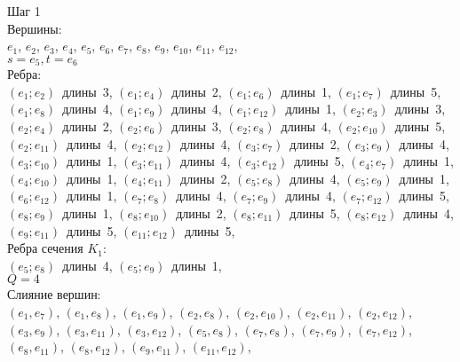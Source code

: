 \bigskip
\noindent
\begin{minipage}{\textwidth}
Шаг 1\\
Вершины:\\
\mbox{$e_{1}$},
\mbox{$e_{2}$},
\mbox{$e_{3}$},
\mbox{$e_{4}$},
\mbox{$e_{5}$},
\mbox{$e_{6}$},
\mbox{$e_{7}$},
\mbox{$e_{8}$},
\mbox{$e_{9}$},
\mbox{$e_{10}$},
\mbox{$e_{11}$},
\mbox{$e_{12}$},
\\
\mbox{$s=e_{5},t=e_{6}$}\\
Ребра:\\
\mbox{$(e_{1};e_{2})$ длины 3},
\mbox{$(e_{1};e_{4})$ длины 2},
\mbox{$(e_{1};e_{6})$ длины 1},
\mbox{$(e_{1};e_{7})$ длины 5},
\mbox{$(e_{1};e_{8})$ длины 4},
\mbox{$(e_{1};e_{9})$ длины 4},
\mbox{$(e_{1};e_{12})$ длины 1},
\mbox{$(e_{2};e_{3})$ длины 3},
\mbox{$(e_{2};e_{4})$ длины 2},
\mbox{$(e_{2};e_{6})$ длины 3},
\mbox{$(e_{2};e_{8})$ длины 4},
\mbox{$(e_{2};e_{10})$ длины 5},
\mbox{$(e_{2};e_{11})$ длины 4},
\mbox{$(e_{2};e_{12})$ длины 4},
\mbox{$(e_{3};e_{7})$ длины 2},
\mbox{$(e_{3};e_{9})$ длины 4},
\mbox{$(e_{3};e_{10})$ длины 1},
\mbox{$(e_{3};e_{11})$ длины 4},
\mbox{$(e_{3};e_{12})$ длины 5},
\mbox{$(e_{4};e_{7})$ длины 1},
\mbox{$(e_{4};e_{10})$ длины 1},
\mbox{$(e_{4};e_{11})$ длины 2},
\mbox{$(e_{5};e_{8})$ длины 4},
\mbox{$(e_{5};e_{9})$ длины 1},
\mbox{$(e_{6};e_{12})$ длины 1},
\mbox{$(e_{7};e_{8})$ длины 4},
\mbox{$(e_{7};e_{9})$ длины 4},
\mbox{$(e_{7};e_{12})$ длины 5},
\mbox{$(e_{8};e_{9})$ длины 1},
\mbox{$(e_{8};e_{10})$ длины 2},
\mbox{$(e_{8};e_{11})$ длины 5},
\mbox{$(e_{8};e_{12})$ длины 4},
\mbox{$(e_{9};e_{11})$ длины 5},
\mbox{$(e_{11};e_{12})$ длины 5},
\\
Ребра сечения $K_{1}$:\\
\mbox{$(e_{5};e_{8})$ длины 4},
\mbox{$(e_{5};e_{9})$ длины 1},
\\
$Q=4$\\
Слияние вершин:\\
\mbox{$(e_{1},e_{7})$},
\mbox{$(e_{1},e_{8})$},
\mbox{$(e_{1},e_{9})$},
\mbox{$(e_{2},e_{8})$},
\mbox{$(e_{2},e_{10})$},
\mbox{$(e_{2},e_{11})$},
\mbox{$(e_{2},e_{12})$},
\mbox{$(e_{3},e_{9})$},
\mbox{$(e_{3},e_{11})$},
\mbox{$(e_{3},e_{12})$},
\mbox{$(e_{5},e_{8})$},
\mbox{$(e_{7},e_{8})$},
\mbox{$(e_{7},e_{9})$},
\mbox{$(e_{7},e_{12})$},
\mbox{$(e_{8},e_{11})$},
\mbox{$(e_{8},e_{12})$},
\mbox{$(e_{9},e_{11})$},
\mbox{$(e_{11},e_{12})$},
\end{minipage}
\bigskip
\noindent
